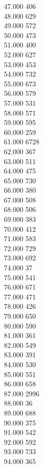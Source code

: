 { 47.000	406 \\
 48.000	629 \\
 49.000	572 \\
 50.000	473 \\
 51.000	400 \\
 52.000	627 \\
 53.000	453 \\
 54.000	732 \\
 55.000	673 \\
 56.000	579 \\
 57.000	531 \\
 58.000	571 \\
 59.000	595 \\
 60.000	259 \\
 61.000	6728 \\
 62.000	367 \\
 63.000	511 \\
 64.000	475 \\
 65.000	730 \\
 66.000	380 \\
 67.000	508 \\
 68.000	506 \\
 69.000	383 \\
 70.000	412 \\
 71.000	583 \\
 72.000	729 \\
 73.000	692 \\
 74.000	37 \\
 75.000	541 \\
 76.000	671 \\
 77.000	471 \\
 78.000	426 \\
 79.000	650 \\
 80.000	590 \\
 81.000	361 \\
 82.000	549 \\
 83.000	391 \\
 84.000	530 \\
 85.000	551 \\
 86.000	658 \\
 87.000	2996 \\
 88.000	36 \\
 89.000	688 \\
 90.000	375 \\
 91.000	542 \\
 92.000	592 \\
 93.000	733 \\
 94.000	365 \\
}
